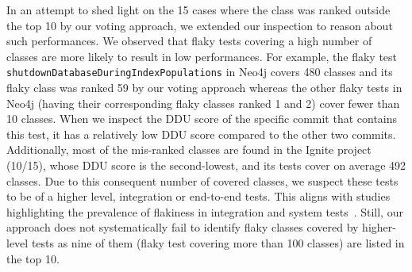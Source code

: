 In an attempt to shed light on the 15 cases where the class was ranked outside the top 10 by our voting approach, we extended our inspection to reason about such performances. We observed that flaky tests covering a high number of classes are more likely to result in low performances. 
For example, the flaky test \texttt{shutdownDatabaseDuringIndexPopulations} in Neo4j covers 480 classes and its flaky class was ranked 59 by our voting approach whereas the other flaky tests in Neo4j (having their corresponding flaky classes ranked 1 and 2) cover fewer than 10 classes. When we inspect the DDU score of the specific commit that contains this test, it has a relatively low DDU score compared to the other two commits. 
Additionally, most of the mis-ranked classes are found in the Ignite project (10/15), whose DDU score is the second-lowest, and its tests cover on average 492 classes. Due to this consequent number of covered classes, we suspect these tests to be of a higher level, \ie integration or end-to-end tests. 
This aligns with studies highlighting the prevalence of flakiness in integration and system tests~\cite{Kowalczyk2020,Herzig2015}.
Still, our approach does not systematically fail to identify flaky classes covered by higher-level tests as nine of them (flaky test covering more than 100 classes) are listed in the top 10.